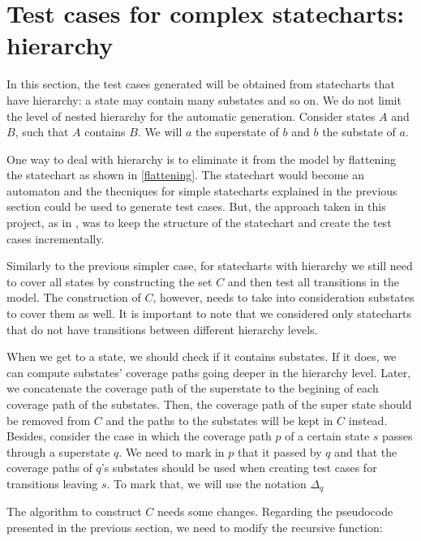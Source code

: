 \section{Test cases for complex statecharts: hierarchy}
\label{testHierarchy}

In this section, the test cases generated will be obtained from statecharts that have hierarchy: a state may contain many substates and so on. We do not limit the level of nested hierarchy for the automatic generation. Consider states $A$ and $B$, such that $A$ contains $B$. We will $a$ the superstate of $b$ and $b$ the substate of $a$.

One way to deal with hierarchy is to eliminate it from the model by flattening the statechart as shown in \ref{flattening}. The statechart would become an automaton and the thecniques for simple statecharts explained in the previous section could be used to generate test cases. But, the approach taken in this project, as in \cite{bogdanov}, was to keep the structure of the statechart and create the test cases incrementally.

Similarly to the previous simpler case, for statecharts with hierarchy we still need to cover all states by constructing the set $C$ and then test all transitions in the model. The construction of $C$, however, needs to take into consideration substates to cover them as well. It is important to note that we considered only statecharts that do not have transitions between different hierarchy levels. 

When we get to a state, we should check if it contains substates. If it does, we can compute substates' coverage paths going deeper in the hierarchy level. Later, we concatenate the coverage path of the superstate to the begining of each coverage path of the substates. Then, the coverage path of the super state should be removed from $C$ and the paths to the substates will be kept in $C$ instead. Besides, consider the case in which the coverage path $p$ of a certain state $s$ passes through a superstate $q$. We need to mark in $p$ that it passed by $q$ and that the coverage paths of $q$'s substates should be used when creating test cases for transitions leaving $s$. To mark that, we will use the notation $\Delta_q$

The algorithm to construct $C$ needs some changes. Regarding the pseudocode presented in the previous section, we need to modify the recursive function:


